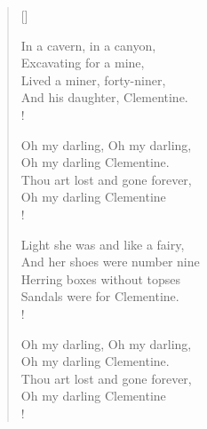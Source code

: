 \documentclass[11pt, a4paper]{article} %
\begin{document}
\begin{verse}[\versewidth]

\begin{altverse} %
In a cavern, in a canyon, \\
Excavating for a mine, \\
Lived a miner, forty-niner, \label{vs:49} \\
And his daughter, Clementine. \\!
\end{altverse}


\begin{altverse} %
Oh my darling, Oh my darling, \\
Oh my darling Clementine. \\
Thou art lost and gone forever, \\
Oh my darling Clementine \\!
\end{altverse}


\begin{altverse} %
Light she was and like a fairy, \\
And her shoes were number nine \\
Herring boxes without topses \\
Sandals were for Clementine. \\!
\end{altverse}


\begin{altverse} %
 Oh my darling, Oh my darling, \\
Oh my darling Clementine. \\
Thou art lost and gone forever, \\
Oh my darling Clementine \\!
\end{altverse}

\end{verse}

\end{document}
